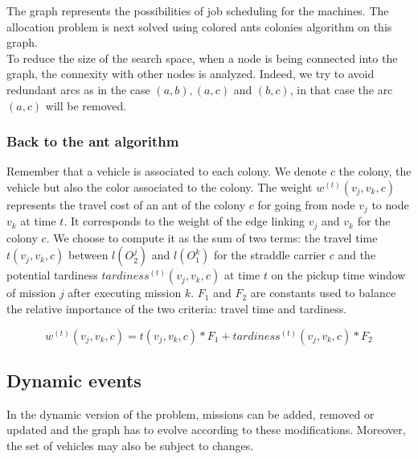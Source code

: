 \documentclass[review]{elsarticle}
\begin{document}
The graph represents the possibilities of job scheduling for the machines. The allocation problem is next solved using colored ants colonies algorithm on this graph.\\

To reduce the size of the search space, when a node is being connected into the graph, the connexity with other nodes is analyzed. Indeed, we try to avoid redundant arcs as in the case $(a,b), (a,c)$ and $(b,c)$, in that case the arc $(a,c)$ will be removed.%

\subsubsection{Back to the ant algorithm}

Remember that a vehicle is associated to each colony. We denote $c$ the colony, the vehicle but also the color associated to the colony. The weight $w^{(t)}(v_j,v_k,c)$ represents the travel cost of an ant of the colony $c$ for going from node $v_j$ to node $v_k$ at time $t$. It corresponds to the weight of the edge linking $v_j$ and $v_k$ for the colony $c$. We choose to compute it as the sum of two terms: the travel time $t(v_j,v_k,c)$ between $l(O_2^j)$ and $l(O_1^k)$ for the straddle carrier $c$ and the potential tardiness $tardiness^{(t)}(v_j,v_k,c)$ at time $t$ on the pickup time window of mission $j$ after executing mission $k$. $F_1$ and $F_2$ are constants used to balance the relative importance of the two criteria: travel time and tardiness.

\begin{equation*}
  w^{(t)}(v_j,v_k,c) = t(v_j,v_k,c)*F_1 + tardiness^{(t)}(v_j,v_k,c)*F_2
\end{equation*}

\subsection{Dynamic events}

In the dynamic version of the problem, missions can be added, removed or updated and the graph has to evolve according to these modifications. Moreover, the set of vehicles may also be subject to changes.\\
\end{document}
